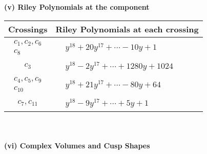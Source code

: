 \documentclass[1p]{elsarticle_modified}
\theoremstyle{definition}
\begin{document}
\newpage\renewcommand{\arraystretch}{1}
\flushleft \textbf{(v) Riley Polynomials at the component}\newline \\
\begin{tabular}{m{50pt}|m{274pt}}
Crossings & \hspace{64pt}Riley Polynomials at each crossing \\
\hline $$\begin{aligned}c_{1},c_{2},c_{6}\\c_{8}\end{aligned}$$&$\begin{aligned}
&y^{18}+20 y^{17}+\cdots-10 y+1
\end{aligned}$\\
\hline $$\begin{aligned}c_{3}\end{aligned}$$&$\begin{aligned}
&y^{18}-2 y^{17}+\cdots+1280 y+1024
\end{aligned}$\\
\hline $$\begin{aligned}c_{4},c_{5},c_{9}\\c_{10}\end{aligned}$$&$\begin{aligned}
&y^{18}+21 y^{17}+\cdots-80 y+64
\end{aligned}$\\
\hline $$\begin{aligned}c_{7},c_{11}\end{aligned}$$&$\begin{aligned}
&y^{18}-9 y^{17}+\cdots+5 y+1
\end{aligned}$\\
\hline
\end{tabular}\\~\\
\newpage\flushleft \textbf{(vi) Complex Volumes and Cusp Shapes}
\end{document}
